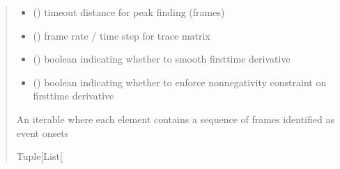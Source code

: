 \documentclass[letterpaper,10pt,english]{sphinxmanual}
\begin{document}
\begin{fulllineitems}
\begin{quote}
\begin{description}
\begin{itemize}
\item {} 
\sphinxAtStartPar
{} () \textendash{} timeout distance for peak finding (frames)

\item {} 
\sphinxAtStartPar
{} () \textendash{} frame rate / time step for trace matrix

\item {} 
\sphinxAtStartPar
{} () \textendash{} boolean indicating whether to smooth first\sphinxhyphen{}time derivative

\item {} 
\sphinxAtStartPar
{} () \textendash{} boolean indicating whether to enforce non\sphinxhyphen{}negativity constraint on first\sphinxhyphen{}time derivative

\end{itemize}

\sphinxAtStartPar
An iterable where each element contains a sequence of frames identified as event onsets

\sphinxAtStartPar
Tuple{[}List{[}\sphinxhref{https://docs.python.org/3/library/functions.html\#int}{int}{]}{]}

\end{description}\end{quote}

\end{fulllineitems}

\end{document}
